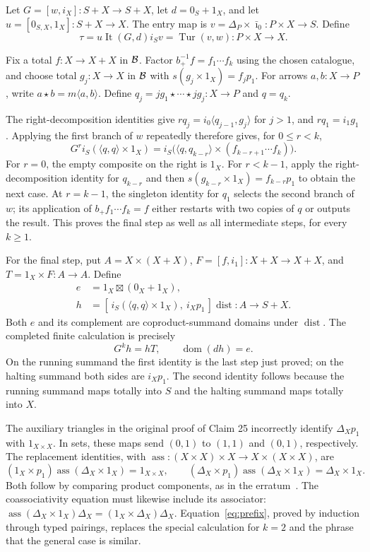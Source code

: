 \documentclass[11pt]{article}
\newcommand{\dom}{\operatorname{dom}}\newcommand{\ran}{\operatorname{ran}}
\newcommand{\It}{\operatorname{It}}\newcommand{\Tur}{\operatorname{Tur}}
\newcommand{\dist}{\operatorname{dist}}\newcommand{\ass}{\operatorname{ass}}
\begin{document}
Let $G=[w,i_X]:S+X\to S+X$, let $d=0_S+1_X$, and let $u=[0_{S,X},1_X]:S+X\to X$. The entry map is $v=\Delta_P\times\bar\imath_0:P\times X\to S$. Define
\begin{equation}\label{eq:tau}
\tau=u\It(G,d)i_Sv=\Tur(v,w):P\times X\to X.
\end{equation}

Fix a total $f:X\to X+X$ in $\mathcal B$. Factor $b_+^{-1}f=f_1\cdots f_k$ using the chosen catalogue, and choose total $g_j:X\to X$ in $\mathcal B$ with $s(g_j\times1_X)=f_jp_1$. For arrows $a,b:X\to P$, write $a\star b=m\langle a,b\rangle$. Define $q_j=jg_1\star\cdots\star jg_j:X\to P$ and $q=q_k$.

The right-decomposition identities give $rq_j=i_0\langle q_{j-1},g_j\rangle$ for $j>1$, and $rq_1=i_1g_1$. Applying the first branch of $w$ repeatedly therefore gives, for $0\leq r<k$,
\begin{equation}\label{eq:prefix}
G^ri_S(\langle q,q\rangle\times1_X)
=i_S\bigl(\langle q,q_{k-r}\rangle\times(f_{k-r+1}\cdots f_k)\bigr).
\end{equation}
For $r=0$, the empty composite on the right is $1_X$. For $r<k-1$, apply the right-decomposition identity for $q_{k-r}$ and then $s(g_{k-r}\times1_X)=f_{k-r}p_1$ to obtain the next case. At $r=k-1$, the singleton identity for $q_1$ selects the second branch of $w$; its application of $b_+f_1\cdots f_k=f$ either restarts with two copies of $q$ or outputs the result. This proves the final step as well as all intermediate steps, for every $k\geq1$.

For the final step, put $A=X\times(X+X)$, $F=[f,i_1]:X+X\to X+X$, and $T=1_X\times F:A\to A$. Define
\begin{align*}
e&=1_X\boxtimes(0_X+1_X),\\
h&=[\,i_S(\langle q,q\rangle\times1_X),\ i_Xp_1\,]\dist:A\to S+X.
\end{align*}
Both $e$ and its complement are coproduct-summand domains under $\dist$. The completed finite calculation is precisely
\begin{equation}\label{eq:block}
G^kh=hT,\qquad \dom(dh)=e.
\end{equation}
On the running summand the first identity is the last step just proved; on the halting summand both sides are $i_Xp_1$. The second identity follows because the running summand maps totally into $S$ and the halting summand maps totally into $X$.

The auxiliary triangles in the original proof of Claim 25 incorrectly identify $\Delta_Xp_1$ with $1_{X\times X}$. In sets, these maps send $(0,1)$ to $(1,1)$ and $(0,1)$, respectively. The replacement identities, with $\ass:(X\times X)\times X\to X\times(X\times X)$, are
\[
(1_X\times p_1)\ass(\Delta_X\times1_X)=1_{X\times X},\qquad
(\Delta_X\times p_1)\ass(\Delta_X\times1_X)=\Delta_X\times1_X.
\]
Both follow by comparing product components, as in the erratum~\cite{E}. The coassociativity equation must likewise include its associator: $\ass(\Delta_X\times1_X)\Delta_X=(1_X\times\Delta_X)\Delta_X$. Equation~\eqref{eq:prefix}, proved by induction through typed pairings, replaces the special calculation for $k=2$ and the phrase that the general case is similar.
\end{document}

